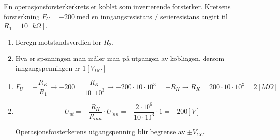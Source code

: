 \begin{question}[name=Oppgave, topic=operasjonsforsterker]
En operasjonsforsterkerkrets er koblet som inverterende forsterker. Kretsens forsterkning $F_U = -200$ med en inngangsresistans / serieresistans angitt til $R_1=10[k\Omega]$.

	\begin{enumerate}[label=\roman*)]
		\item Beregn motstandsverdien for $R_2$.
		\item Hva er spenningen man måler man på utgangen av koblingen, dersom inngangspenningen er $1[V_{DC}]$
	\end{enumerate}


\end{question}

\vspace{0.5cm} %

\begin{solution}[name=Løsningsforslag oppgave]

		\begin{enumerate}[label=\roman*)]
		\item
\[F_U =- \frac{R_K}{R_1} \rightarrow -200= \frac{R_K}{10 \cdot 10^3} \rightarrow -200 \cdot 10 \cdot 10^3 = -R_K \rightarrow R_K = 200 \cdot 10 \cdot 10^3 = 2[M\Omega]\]

		\item
\[U_{ut}=-\frac{R_K}{R_{inn}} \cdot U_{inn} = -\frac{2\cdot 10^6}{10 \cdot 10^3} \cdot 1 = -200[V]\]

Operasjonsforsterkerens utgangspenning blir begrense av $\pm V_{CC}$.
	\end{enumerate}

\end{solution}
\vspace{0.5cm} %


